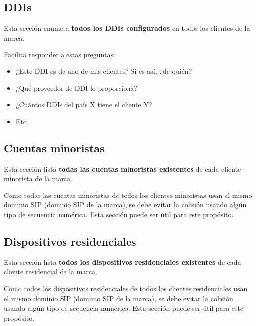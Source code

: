 \documentclass[letterpaper,10pt,spanish]{sphinxmanual}
\begin{document}
\subsection{DDIs}
\label{administration_portal/brand/views/ddis:ddis}\label{administration_portal/brand/views/ddis::doc}\label{administration_portal/brand/views/ddis:id1}
Esta sección enumera \textbf{todos los DDIs configurados} en todos los clientes de la marca.

Facilita responder a estas preguntas:
\begin{itemize}
\item {} 
¿Este DDI es de uno de mis clientes? Si es así, ¿de quién?

\item {} 
¿Qué proveedor de DDI lo proporciona?

\item {} 
¿Cuántos DDIs del país X tiene el cliente Y?

\item {} 
Etc.

\end{itemize}


\subsection{Cuentas minoristas}
\label{administration_portal/brand/views/retail_accounts::doc}\label{administration_portal/brand/views/retail_accounts:retail-accounts}
Esta sección lista \textbf{todas las cuentas minoristas existentes} de cada cliente minorista de la marca.

Como todas las cuentas minoristas de todos los clientes minoristas usan el mismo dominio SIP (dominio SIP de la marca), se debe evitar la colisión usando algún tipo de secuencia numérica. Esta sección puede ser útil para este propósito.


\subsection{Dispositivos residenciales}
\label{administration_portal/brand/views/residential_devices::doc}\label{administration_portal/brand/views/residential_devices:residential-devices}
Esta sección lista \textbf{todos los dispositivos residenciales existentes} de cada cliente residencial de la marca.

Como todos los dispositivos residenciales de todos los clientes residenciales usan el mismo dominio SIP (dominio SIP de la marca), se debe evitar la colisión usando algún tipo de secuencia numérica. Esta sección puede ser útil para este propósito.
\end{document}
